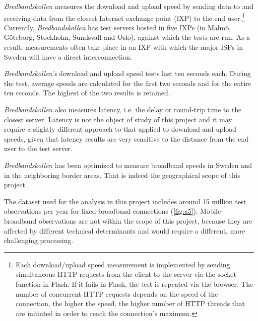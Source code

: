 \documentclass[12pt]{article}
\begin{document}
\textit{Bredbandskollen} measures the download and upload speed by sending data to and receiving data from the closest Internet exchange point (IXP) to the end user.\footnote{
Each download/upload speed measurement is implemented by sending simultaneous HTTP requests from the client to the server via the socket function in Flash. If it fails in Flash, the test is repeated via the browser. The number of concurrent HTTP requests depends on the speed of the connection, the higher the speed, the higher number of HTTP threads that are initiated in order to reach the connection's maximum.} Currently,  \textit{Bredbandskollen} has test servers hosted in five IXPs (in Malmö, Göteborg, Stockholm, Sundsvall and Oslo), against which the tests are run. As a result, measurements often take place in an IXP with which the major ISPs in Sweden will have a direct interconnection. 

\textit{Bredbandskollen's} download and upload speed tests last ten seconds each. During the test, average speeds are calculated for the first two seconds and for the entire ten seconds. The highest of the two results is retained.  

\textit{Bredbandskollen} also measures latency, i.e. the delay or round-trip time to the closest server. Latency is not the object of study of this project and it may require a slightly different approach to that applied to download and upload speeds, given that latency results are very sensitive to the distance from the end user to the test server.     

\textit{Bredbandskollen} has been optimized to measure broadband speeds in Sweden and in the neighboring border areas. That is indeed the geographical scope of this project. 

The dataset used for the analysis in this project includes around 15 million test observations per year for fixed-broadband connections (\autoref{fig:a5}). Mobile-broadband observations are not within the scope of this project, because they are affected by different technical determinants and would require a different, more challenging processing.
\end{document}
